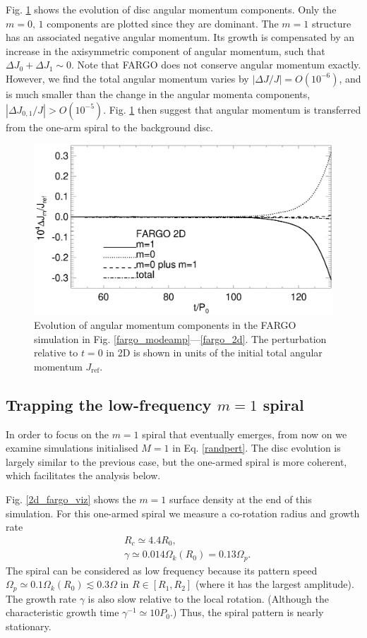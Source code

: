 Fig. \ref{2d_angmom} shows the evolution of disc angular momentum
components. Only the $m=0,\,1$ components are 
plotted since they are dominant. The $m=1$ structure has
an associated negative angular momentum.  
Its growth is compensated by an increase in the axisymmetric
component of angular momentum, such that $\Delta J_0 + \Delta
J_1 \sim 0$. Note that FARGO does not conserve angular momentum
exactly. However, we find the total angular momentum varies by 
$|\Delta J/J|= O(10^{-6})$, and is much smaller than the
change in the angular momenta components, $|\Delta J_{0,1}/J|>
O(10^{-5})$. Fig. \ref{2d_angmom} then suggest that angular momentum
is transferred from the one-arm spiral to the background disc.    

\begin{figure}
  \includegraphics[width=\linewidth]{figures/nonaxi_evol_ang_fargo}
  \caption{Evolution of angular momentum components in the 
    FARGO simulation in Fig. \ref{fargo_modeamp}---\ref{fargo_2d}. The
    perturbation relative to $t=0$ in 2D is shown in units of the 
    initial total angular momentum $J_\mathrm{ref}$.\label{2d_angmom}} 
\end{figure}   

\subsection{Trapping the low-frequency $m=1$ spiral}\label{fargo_m1}
In order to focus on the $m=1$ spiral that eventually emerges, from
now on we examine simulations initialised 
$M=1$ in Eq. \ref{randpert}. The disc 
evolution is largely similar to the previous case, but the one-armed spiral is
more coherent, which facilitates the analysis below. 

Fig. \ref{2d_fargo_viz} shows the $m=1$ surface density
at the end of this simulation. For this one-armed spiral
we measure a co-rotation radius and growth rate  
\begin{align*}
  &R_c \simeq 4.4R_0,\\
  &\gamma\simeq 0.014\Omega_k(R_0) = 0.13\Omega_p. 
\end{align*}
The spiral can be considered as low frequency because its 
pattern speed $\Omega_p \simeq 0.1\Omega_k(R_0)\lesssim 0.3\Omega$ in
$R\in[R_{1},R_{2}]$ (where it has the largest amplitude). The growth rate $\gamma$ is also slow
relative to the local rotation. (Although the characteristic growth
time $\gamma^{-1} \simeq 10P_0$.) Thus, the spiral 
pattern is nearly stationary. 

